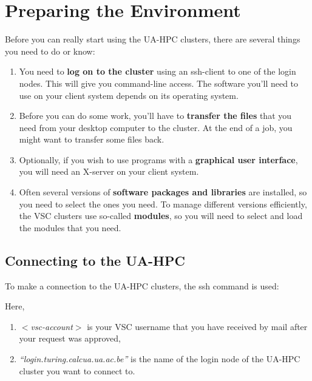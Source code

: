 \chapter{Preparing the Environment}
\label{ch:setting-up-the-environment}

Before you can really start using the UA-HPC clusters, there are several things you need to do or know:

\begin{enumerate}
\item  You need to \textbf{log on to the cluster} using an ssh-client to one of the login nodes. This will give you command-line access. The software you'll need to use on your client system depends on its operating system.
\item  Before you can do some work, you'll have to \textbf{transfer the files} that you need from your desktop computer to the cluster. At the end of a job, you might want to transfer some files back.
\item  Optionally, if you wish to use programs with a \textbf{graphical user interface}, you will need an X-server on your client system.
\item  Often several versions of \textbf{software packages and libraries} are installed, so you need to select the ones you need. To manage different versions efficiently, the VSC clusters use so-called \textbf{modules}, so you will need to select and load the modules that you need.
\end{enumerate}

\section{Connecting to the UA-HPC}

To make a connection to the UA-HPC clusters, the ssh command is used:

\begin{prompt}
$ %
\end{prompt}

Here,

\begin{enumerate}
\item  \textit{$<$vsc-account$>$} is your VSC username that you have received by mail after your request was approved,
\item  \textit{``login.turing.calcua.ua.ac.be''} is the name of the login node of the UA-HPC cluster you want to connect to.
\end{enumerate}


